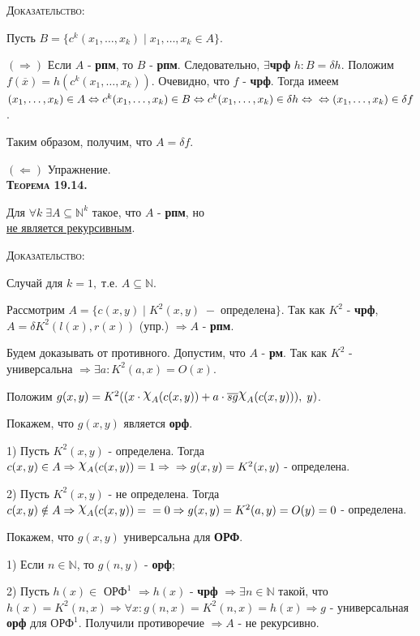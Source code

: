 \documentclass[18pt, a4paper]{extarticle}
\newcommand{\teor}[1]{\textbf{\textsc{Теорема #1}}}
\newcommand{\dok}{\textsc{Доказательство:}}
\begin{document}
\dok

Пусть $B = \{c^k(x_1,\ldots,x_k)\;|\;x_1,\ldots,x_k\in A\}$.

$\boxed{(\Rightarrow)}$ Если $A$ -  \textbf{рпм}, то $B$ -  \textbf{рпм}. Следовательно, $\exists$\textbf{чрф} $h: B = \delta h$. Положим $f(\overline{x}) = h(c^k(x_1,\ldots,x_k))$. Очевидно, что $f$ -  \textbf{чрф}. Тогда имеем $(x_1,\ldots,x_k)\in A\Leftrightarrow c^k(x_1,\ldots,x_k)\in B\Leftrightarrow c^k(x_1,\ldots,x_k)\in\delta h\Leftrightarrow\\\Leftrightarrow (x_1,\ldots,x_k)\in\delta f$.

Таким образом, получим, что $A = \delta f$.

$\boxed{(\Leftarrow)}$ Упражнение.\\

\teor{19.14.} 

Для $\forall k\;\exists A\subseteq\mathbb N^k$ такое, что $A$ - \textbf{рпм}, но \\
\underline{не является рекурсивным}.

\dok 

Случай для $k=1,\;\text{т.е. }A\subseteq\mathbb N$.

Рассмотрим $A=\{c(x,y)\;|\;K^2(x,y)\;-\;\text{определена}\}$. Так как $K^2$ - \textbf{чрф}, $A=\delta K^2(l(x),r(x))$ (упр.) $\Rightarrow A$ - \textbf{рпм}.

Будем доказывать от противного. Допустим, что $A$ - \textbf{рм}. Так как $K^2$ - универсальна $\Rightarrow\exists a:K^2(a,x)=O(x)$. 

Положим $g(x,y)=K^2((x\cdot\raisebox{.5ex}{\scalebox{1.2}{$\chi$}}_A(c(x,y))+a\cdot\overline{sg}\raisebox{.5ex}{\scalebox{1.2}{$\chi$}}_A(c(x,y))),\;y)$.

Покажем, что $g(x,y)$ является \textbf{орф}.

1) Пусть $K^2(x,y)$ -  определена. Тогда $c(x,y)\in A \Rightarrow \raisebox{.5ex}{\scalebox{1.2}{$\chi$}}_A(c(x,y)) = 1 \Rightarrow\\\Rightarrow g(x,y) = K^2(x,y)$ -  определена.

2) Пусть $K^2(x,y)$ -  не определена. Тогда $c(x,y)\notin A \Rightarrow \raisebox{.5ex}{\scalebox{1.2}{$\chi$}}_A(c(x,y)) =\\= 0 \Rightarrow g(x,y) = K^2(a,y) = O(y) = 0$ -  определена.

Покажем, что $g(x,y)$ универсальна для \textbf{ОРФ}.

1) Если $n\in\mathbb N$, то $g(n,y)$ - \textbf{орф};

2) Пусть $h(x)\in$ \textbf{$\text{ОРФ}^1$} $\Rightarrow h(x)$ - \textbf{чрф} $\Rightarrow\exists n\in\mathbb N$ такой, что\\ 
$h(x)=K^2(n,x)\Rightarrow\forall x: g(n,x)=K^2(n,x)=h(x)\Rightarrow g$ - универсальная \textbf{орф} для \textbf{$\text{ОРФ}^1$}. Получили противоречие $\Rightarrow A$ - не рекурсивно.
\end{document}
